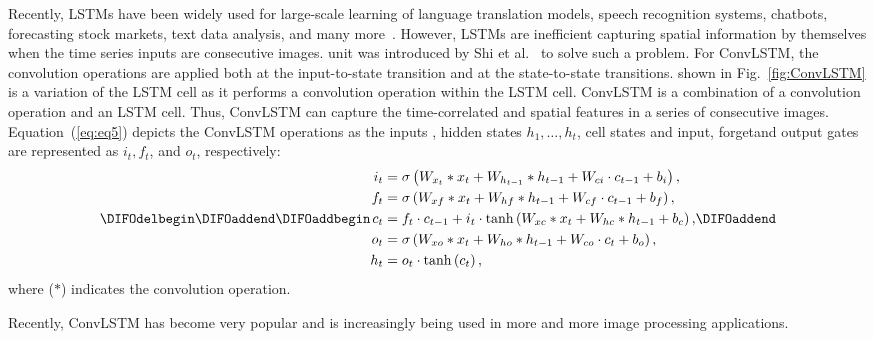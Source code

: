Recently, LSTMs have been widely used for large-scale learning of language translation models, speech recognition systems, chatbots, forecasting stock markets, text data analysis, and many more~\cite{graves2014towards, cho2014properties}. 
However, LSTMs are inefficient \DIFdelbegin {}\DIFdelend \DIFaddbegin {}\DIFaddend capturing spatial information by themselves when the time series inputs are consecutive images.
\DIFdelbegin {}\DIFdelend \DIFaddbegin {}\DIFaddend unit was introduced by Shi et al.~\cite{xingjian2015convolutional} to solve such a problem.
For ConvLSTM, the convolution operations are applied both at the input-to-state transition and at the state-to-state transitions.  
\DIFdelbegin {}\DIFdelend \DIFaddbegin {}\DIFaddend shown in Fig.~\ref{fig:ConvLSTM} is a variation of the LSTM cell as it performs a convolution operation within the LSTM cell.
ConvLSTM is a combination of a convolution operation and an LSTM cell.
Thus, ConvLSTM can capture the time-correlated and spatial features in a series of consecutive images.
Equation~(\ref{eq:eq5}) depicts the ConvLSTM operations as the inputs \DIFdelbegin {}\DIFdelend \DIFaddbegin {}\DIFaddend , hidden states \(h_1, \dots, h_t\), cell states \DIFdelbegin {}\DIFdelend \DIFaddbegin {}\DIFaddend and input, forget\DIFaddbegin \DIFadd{, }\DIFaddend and output gates are represented as \(i_t, f_t\), and \(o_t\), respectively:
\begin{equation}
	\DIFdelbegin %
\DIFdelend \DIFaddbegin \begin{aligned}
		i_{t} &=\sigma\left(W_{x_t} * x_{t}+W_{h_{t-1}} * h_{t-1}+W_{c i} \cdot c_{t-1}+b_{i}\right),
		\\
		f_{t} &=\sigma\left(W_{x f} * x_{t}+W_{h f} * h_{t-1}+W_{c f} \cdot c_{t-1}+b_{f}\right), \\
		c_{t} &=f_{t} \cdot c_{t-1}+i_{t} \cdot \tanh \left(W_{x c} * x_{t}+W_{h c} * h_{t-1}+b_{c}\right), 
		\\
		o_{t} &=\sigma\left(W_{x o} * x_{t}+W_{h o} * h_{t-1}+W_{c o} \cdot c_{t}+b_{o}\right), \\
		h_{t} &=o_{t} \cdot \tanh \left(c_{t}\right),
	\end{aligned}\DIFaddend 
	\label{eq:eq5}
\end{equation}
where (\(*\)) indicates the convolution \DIFaddbegin {}\DIFaddend operation.

Recently, ConvLSTM has become very popular and is increasingly being used in 
more and more image processing applications.